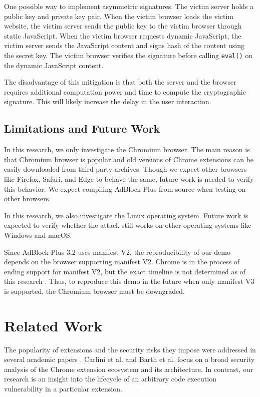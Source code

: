 \documentclass[conference]{IEEEtran}
\begin{document}
One possible way to implement asymmetric signatures. The victim server holds a public key and private key pair. When the victim browser loads the victim website, the victim server sends the public key to the victim browser through static JavaScript. When the victim browser requests dynamic JavaScript, the victim server sends the JavaScript content and signs hash of the content using the secret key. The victim browser verifies the signature before calling \lstinline{eval()} on the dynamic JavaScript content.

The disadvantage of this mitigation is that both the server and the browser requires additional computation power and time to compute the cryptographic signature. This will likely increase the delay in the user interaction.

\subsection{Limitations and Future Work}

In this research, we only investigate the Chromium browser. The main reason is that Chromium browser is popular and old versions of Chrome extensions can be easily downloaded from third-party archives. Though we expect other browsers like Firefox, Safari, and Edge to behave the same, future work is needed to verify this behavior. We expect compiling AdBlock Plus from source when testing on other browsers.

In this research, we also investigate the Linux operating system. Future work is expected to verify whether the attack still works on other operating systems like Windows and macOS.

Since AdBlock Plus 3.2 uses manifest V2, the reproducibility of our demo depends on the browser supporting manifest V2. Chrome is in the process of ending support for manifest V2, but the exact timeline is not determined as of this research \cite{chrome_manifest_v2}. Thus, to reproduce this demo in the future when only manifest V3 is supported, the Chromium browser must be downgraded.

\section{Related Work}
The popularity of extensions and the security risks they impose were addressed in several academic papers \cite{carlini2012evaluation} \cite{barth2010protecting} \cite{bauer2014analyzing}. Carlini et al. \cite{carlini2012evaluation} and Barth et al. \cite{barth2010protecting} focus on a broad security analysis of the Chrome extension ecosystem and its architecture.  In contrast, our research is an insight into the lifecycle of an arbitrary code execution vulnerability in a particular extension.
\end{document}
